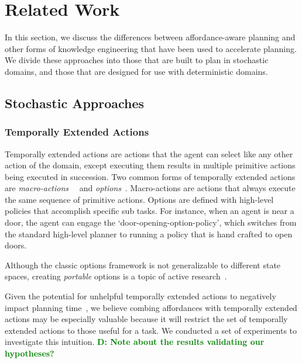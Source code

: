 \documentclass[conference]{IEEEtran}
\newcommand{\dnote}[1]{\textcolor{Green}{\textbf{D: #1}}}
\begin{document}
\section{Related Work}
\label{sec:related-work}

In this section, we discuss the differences between
affordance-aware planning and other forms of knowledge engineering that
have been used to accelerate planning. We divide these approaches
into those that are built to plan in stochastic domains, and those that are
designed for use with deterministic domains.

\subsection{Stochastic Approaches}

\subsubsection{Temporally Extended Actions}
Temporally extended actions are actions that the agent can
select like any other action of the domain, except executing them
results in multiple primitive actions being executed in
succession. Two common forms of temporally extended actions are {\em
  macro-actions}~\cite{hauskrecht98} ~and {\em options}~\cite{sutton99}. 
Macro-actions are actions that always
execute the same sequence of primitive actions. Options are defined
with high-level policies that accomplish specific sub tasks. For
instance, when an agent is near a door, the agent can engage the
`door-opening-option-policy', which switches from the standard
high-level planner to running a policy that is hand crafted to open
doors. 

Although the classic options framework is not generalizable to different state spaces,
creating {\em portable} options is a topic of active research~\cite{konidaris07,konidaris2009efficient,Ravindran03analgebraic,croonenborghs2008learning,andre2002state,konidaris2012transfer}.

Given the potential for unhelpful temporally extended actions to negatively impact planning time~\cite{Jong:2008zr}, we believe combing affordances with temporally extended actions
may be especially valuable because it will restrict the set of temporally extended actions to those
useful for a task. We conducted a set of experiments to investigate this intuition. \dnote{Note about the results validating our hypotheses?}
\end{document}
